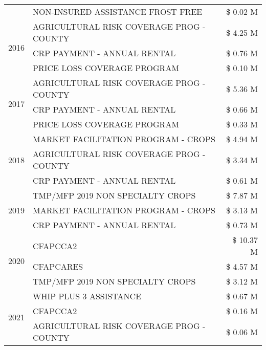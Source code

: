\begin{tabular}{llr}
 & NON-INSURED ASSISTANCE FROST FREE & \$ 0.02 M \\
\cline{1-3}
\multirow[t]{3}{*}{2016} & AGRICULTURAL RISK COVERAGE PROG - COUNTY & \$ 4.25 M \\
 & CRP PAYMENT - ANNUAL RENTAL & \$ 0.76 M \\
 & PRICE LOSS COVERAGE PROGRAM & \$ 0.10 M \\
\cline{1-3}
\multirow[t]{3}{*}{2017} & AGRICULTURAL RISK COVERAGE PROG - COUNTY & \$ 5.36 M \\
 & CRP PAYMENT - ANNUAL RENTAL & \$ 0.66 M \\
 & PRICE LOSS COVERAGE PROGRAM & \$ 0.33 M \\
\cline{1-3}
\multirow[t]{3}{*}{2018} & MARKET FACILITATION PROGRAM - CROPS & \$ 4.94 M \\
 & AGRICULTURAL RISK COVERAGE PROG - COUNTY & \$ 3.34 M \\
 & CRP PAYMENT - ANNUAL RENTAL & \$ 0.61 M \\
\cline{1-3}
\multirow[t]{3}{*}{2019} & TMP/MFP 2019 NON SPECIALTY CROPS & \$ 7.87 M \\
 & MARKET FACILITATION PROGRAM - CROPS & \$ 3.13 M \\
 & CRP PAYMENT - ANNUAL RENTAL & \$ 0.73 M \\
\cline{1-3}
\multirow[t]{3}{*}{2020} & CFAPCCA2 & \$ 10.37 M \\
 & CFAPCARES & \$ 4.57 M \\
 & TMP/MFP 2019 NON SPECIALTY CROPS & \$ 3.12 M \\
\cline{1-3}
\multirow[t]{3}{*}{2021} & WHIP PLUS 3 ASSISTANCE & \$ 0.67 M \\
 & CFAPCCA2 & \$ 0.16 M \\
 & AGRICULTURAL RISK COVERAGE PROG - COUNTY & \$ 0.06 M \\
\cline{1-3}
\bottomrule
\end{tabular}
